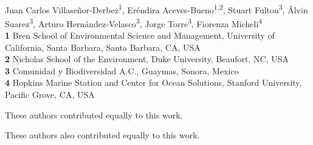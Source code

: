 \documentclass[10pt]{article}
\date{}
\begin{document}
\vspace*{0.2in}


{\Large
\textbf{} %
}
\newline
\\
Juan Carlos Villaseñor-Derbez\textsuperscript{1\Yinyang*},
Eréndira Aceves-Bueno\textsuperscript{1,2\Yinyang},
Stuart Fulton\textsuperscript{3\ddag},
Álvin Suarez\textsuperscript{3\ddag},
Arturo Hernández-Velasco\textsuperscript{3\ddag},
Jorge Torre\textsuperscript{3\ddag},
Fiorenza Micheli\textsuperscript{4\ddag}
\\
\bigskip
\textbf{1} Bren School of Environmental Science and Management, University of California, Santa Barbara, Santa Barbara, CA, USA
\\
\textbf{2} Nicholas School of the Environment, Duke University, Beaufort, NC, USA
\\
\textbf{3} Comunidad y Biodiversidad A.C., Guaymas, Sonora, Mexico
\\
\textbf{4} Hopkins Marine Station and Center for Ocean Solutions, Stanford University, Pacific Grove, CA, USA
\\
\bigskip

% 
%
\Yinyang These authors contributed equally to this work.

\ddag These authors also contributed equally to this work.


\end{document}
